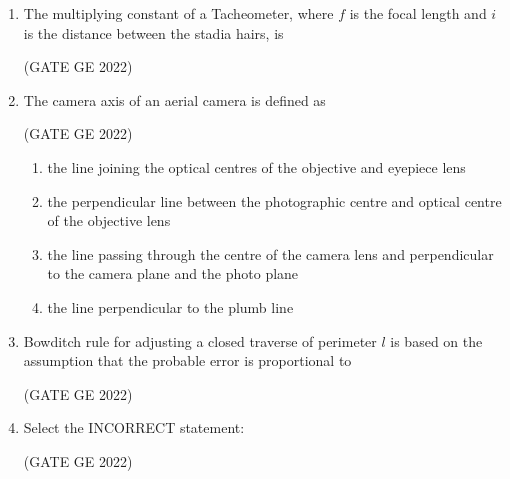 \documentclass[journal,12pt,onecolumn]{IEEEtran}
\theoremstyle{remark}
\begin{document}
\begin{enumerate}
\item The multiplying constant of a Tacheometer, where $f$ is the focal length and $i$ is the distance between the stadia hairs, is

\hfill (GATE GE 2022)

\begin{enumerate}
\end{enumerate}

\item The camera axis of an aerial camera is defined as

\hfill (GATE GE 2022)

\begin{enumerate}
    \item the line joining the optical centres of the objective and eyepiece lens
    \item the perpendicular line between the photographic centre and optical centre of the objective lens
    \item the line passing through the centre of the camera lens and perpendicular to the camera plane and the photo plane
    \item the line perpendicular to the plumb line
\end{enumerate}

\item Bowditch rule for adjusting a closed traverse of perimeter $l$ is based on the assumption that the probable error is proportional to

\hfill (GATE GE 2022)

\begin{enumerate}
\end{enumerate}

\item Select the INCORRECT statement:

\hfill (GATE GE 2022)


\end{enumerate}
\end{document}
